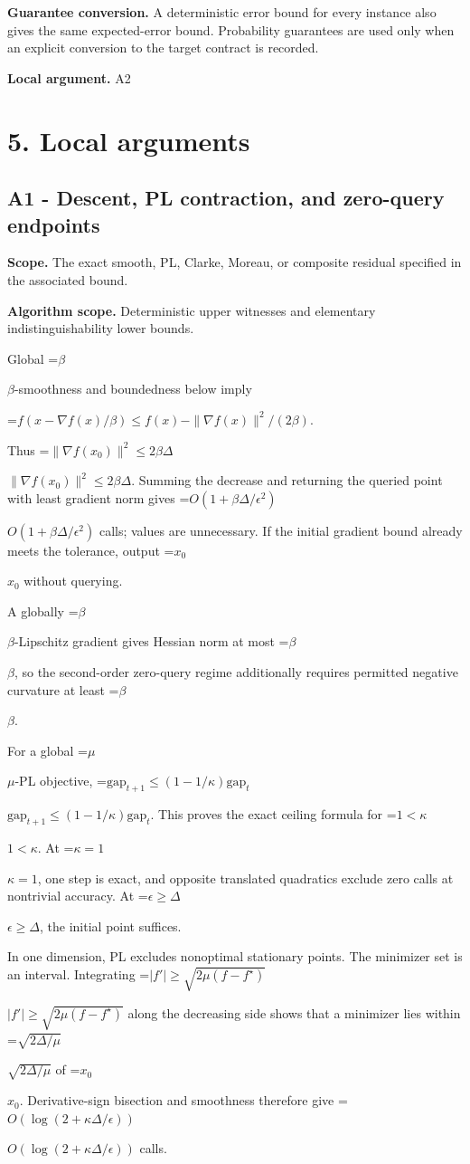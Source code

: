 \documentclass[10pt,a4paper]{article}
\newcommand{\AtlasMath}[1]{\par\begingroup\centering\setbox0=\hbox{$\displaystyle #1$}\ifdim\wd0>1.4\linewidth\typeout{ATLAS WIDE FORMULA: \the\wd0}\fi\ifdim\wd0>\linewidth\resizebox{\linewidth}{!}{\box0}\else\box0\fi\par\endgroup}
\newcommand{\AtlasInlineMath}[1]{\begingroup\setbox0=\hbox{$#1$}\ifdim\wd0>.4\linewidth\endgroup\AtlasMath{#1}\else\endgroup$#1$\fi}
\begin{document}
\textbf{Guarantee conversion.} A deterministic error bound for every instance also gives the same expected-error bound. Probability guarantees are used only when an explicit conversion to the target contract is recorded.

\textbf{Local argument.} A2

\section{5. Local arguments}
\subsection{A1 - Descent, PL contraction, and zero-query endpoints}
\textbf{Scope.} The exact smooth, PL, Clarke, Moreau, or composite residual specified in the associated bound.

\textbf{Algorithm scope.} Deterministic upper witnesses and elementary indistinguishability lower bounds.

Global \AtlasInlineMath{\beta}-smoothness and boundedness below imply

\AtlasMath{f(x-\nabla f(x)/\beta)\le f(x)-\|\nabla f(x)\|^2/(2\beta).}

Thus \AtlasInlineMath{\|\nabla f(x_0)\|^2\le2\beta\Delta}. Summing the decrease and returning the queried point with least gradient norm gives \AtlasInlineMath{O(1+\beta\Delta/\epsilon^2)} calls; values are unnecessary. If the initial gradient bound already meets the tolerance, output \AtlasInlineMath{x_0} without querying.

A globally \AtlasInlineMath{\beta}-Lipschitz gradient gives Hessian norm at most \AtlasInlineMath{\beta}, so the second-order zero-query regime additionally requires permitted negative curvature at least \AtlasInlineMath{\beta}.

For a global \AtlasInlineMath{\mu}-PL objective,
\AtlasInlineMath{\mathrm{gap}_{t+1}\le(1-1/\kappa)\mathrm{gap}_t}.
This proves the exact ceiling formula for \AtlasInlineMath{1<\kappa}. At \AtlasInlineMath{\kappa=1}, one step is exact, and opposite translated quadratics exclude zero calls at nontrivial accuracy. At \AtlasInlineMath{\epsilon\ge\Delta}, the initial point suffices.

In one dimension, PL excludes nonoptimal stationary points. The minimizer set is an interval. Integrating
\AtlasInlineMath{|f'|\ge\sqrt{2\mu(f-f^\star)}}
along the decreasing side shows that a minimizer lies within \AtlasInlineMath{\sqrt{2\Delta/\mu}} of \AtlasInlineMath{x_0}. Derivative-sign bisection and smoothness therefore give \AtlasInlineMath{O(\log(2+\kappa\Delta/\epsilon))} calls.
\end{document}
